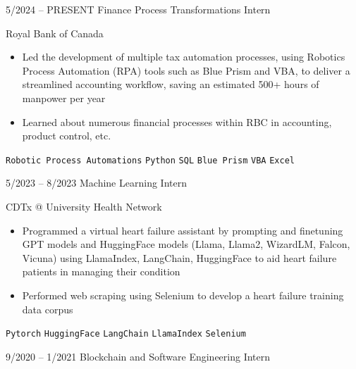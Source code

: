 \documentclass[9pt]{developercv} %
\begin{document}
\vspace{-10 pt}
\begin{entrylist}
    \entry
        {5/2024 -- PRESENT}
		{Finance Process Transformations Intern}
		{}
		{\vspace{-10pt}
  
       Royal Bank of Canada
        \vspace{5pt}
        \begin{itemize}[noitemsep,topsep=0pt,parsep=0pt,partopsep=0pt, leftmargin=-1pt]
            \item Led the development of multiple tax automation processes, using Robotics Process Automation (RPA) tools such as Blue Prism and VBA, to deliver a streamlined accounting workflow,  saving an estimated 500+ hours of manpower per year
            \item Learned about numerous financial processes within RBC in accounting, product control, etc.
        \end{itemize} 
        \vspace{5pt}
        \texttt{Robotic Process Automations} \slashsep \texttt{Python} \slashsep \texttt{SQL} \slashsep \texttt{Blue Prism} \slashsep \texttt{VBA} \slashsep \texttt{Excel}}
	\entry
        {5/2023 -- 8/2023}
		{Machine Learning Intern}
		{}
		{\vspace{-10pt}
  
        CDTx @ University Health Network
        \vspace{5pt}
        \begin{itemize}[noitemsep,topsep=0pt,parsep=0pt,partopsep=0pt, leftmargin=-1pt]
            \item Programmed a virtual heart failure assistant by prompting and finetuning GPT models and HuggingFace models (Llama, Llama2, WizardLM, Falcon, Vicuna) using LlamaIndex, LangChain, HuggingFace to aid heart failure patients in managing their condition
            \item Performed web scraping using Selenium to develop a heart failure training data corpus
        \end{itemize} 
        \vspace{5pt}
        \texttt{Pytorch} \slashsep \texttt{HuggingFace} \slashsep \texttt{LangChain} \slashsep \texttt{LlamaIndex} \slashsep \texttt{Selenium}}
        \entry
		{9/2020 -- 1/2021}
		{Blockchain and Software Engineering Intern}
		{}
		{\vspace{-10pt}
  
}
\end{entrylist}
\end{document}
